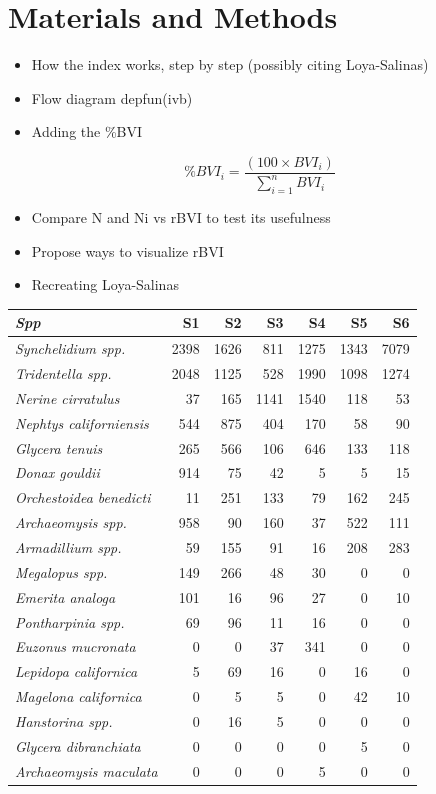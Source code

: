 \documentclass[12pt,]{article}
\begin{document}
\section{Materials and Methods}\label{materials-and-methods}

\begin{itemize}
\item
  How the index works, step by step (possibly citing Loya-Salinas)
\item
  Flow diagram depfun(ivb)
\item
  Adding the \%BVI
\end{itemize}

\begin{equation}\%BVI_i = \frac{(100\times BVI_i)}{\sum_{i = 1}^nBVI_i}\end{equation}

\begin{itemize}
\item
  Compare N and Ni vs rBVI to test its usefulness
\item
  Propose ways to visualize rBVI
\item
  Recreating Loya-Salinas
\end{itemize}

\begin{tabular}{>{\em}lrrrrrr}
\toprule
Spp & S1 & S2 & S3 & S4 & S5 & S6\\
\midrule
Synchelidium spp. & 2398 & 1626 & 811 & 1275 & 1343 & 7079\\
Tridentella spp. & 2048 & 1125 & 528 & 1990 & 1098 & 1274\\
Nerine cirratulus & 37 & 165 & 1141 & 1540 & 118 & 53\\
Nephtys californiensis & 544 & 875 & 404 & 170 & 58 & 90\\
Glycera tenuis & 265 & 566 & 106 & 646 & 133 & 118\\
\addlinespace
Donax gouldii & 914 & 75 & 42 & 5 & 5 & 15\\
Orchestoidea benedicti & 11 & 251 & 133 & 79 & 162 & 245\\
Archaeomysis spp. & 958 & 90 & 160 & 37 & 522 & 111\\
Armadillium spp. & 59 & 155 & 91 & 16 & 208 & 283\\
Megalopus spp. & 149 & 266 & 48 & 30 & 0 & 0\\
\addlinespace
Emerita analoga & 101 & 16 & 96 & 27 & 0 & 10\\
Pontharpinia spp. & 69 & 96 & 11 & 16 & 0 & 0\\
Euzonus mucronata & 0 & 0 & 37 & 341 & 0 & 0\\
Lepidopa californica & 5 & 69 & 16 & 0 & 16 & 0\\
Magelona californica & 0 & 5 & 5 & 0 & 42 & 10\\
\addlinespace
Hanstorina spp. & 0 & 16 & 5 & 0 & 0 & 0\\
Glycera dibranchiata & 0 & 0 & 0 & 0 & 5 & 0\\
Archaeomysis maculata & 0 & 0 & 0 & 5 & 0 & 0\\
\bottomrule
\end{tabular}
\end{document}
